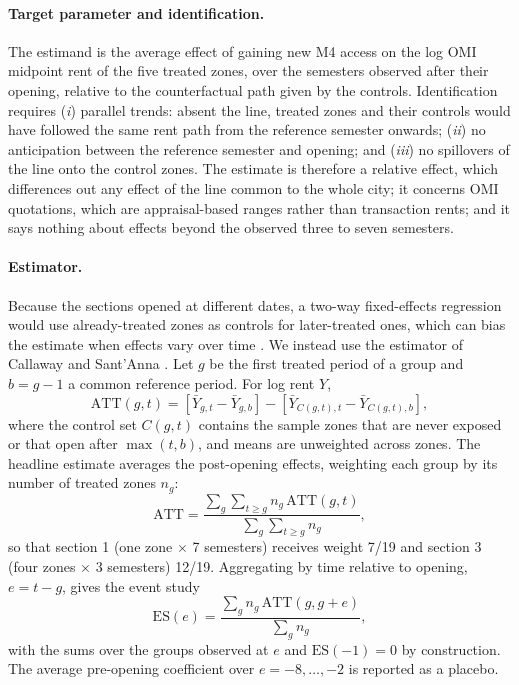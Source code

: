\paragraph{Target parameter and identification.} The estimand is the average effect of gaining new M4 access on the log OMI midpoint rent of the five treated zones, over the semesters observed after their opening, relative to the counterfactual path given by the controls. Identification requires (\textit{i}) parallel trends: absent the line, treated zones and their controls would have followed the same rent path from the reference semester onwards; (\textit{ii}) no anticipation between the reference semester and opening; and (\textit{iii}) no spillovers of the line onto the control zones. The estimate is therefore a relative effect, which differences out any effect of the line common to the whole city; it concerns OMI quotations, which are appraisal-based ranges rather than transaction rents; and it says nothing about effects beyond the observed three to seven semesters.

\paragraph{Estimator.} Because the sections opened at different dates, a two-way fixed-effects regression would use already-treated zones as controls for later-treated ones, which can bias the estimate when effects vary over time \cite{goodmanbacon2021,dechaisemartin2020}. We instead use the estimator of Callaway and Sant'Anna \cite{callaway2021}. Let $g$ be the first treated period of a group and $b=g-1$ a common reference period. For log rent $Y$,
\begin{equation}
\mathrm{ATT}(g,t)=\left[\bar Y_{g,t}-\bar Y_{g,b}\right]-\left[\bar Y_{C(g,t),t}-\bar Y_{C(g,t),b}\right],
\label{eq:attgt}
\end{equation}
where the control set $C(g,t)$ contains the sample zones that are never exposed or that open after $\max(t,b)$, and means are unweighted across zones. The headline estimate averages the post-opening effects, weighting each group by its number of treated zones $n_g$:
\begin{equation}
\mathrm{ATT}=\frac{\sum_g\sum_{t\ge g} n_g\,\mathrm{ATT}(g,t)}{\sum_g\sum_{t\ge g} n_g},
\label{eq:attagg}
\end{equation}
so that section 1 (one zone $\times$ 7 semesters) receives weight 7/19 and section 3 (four zones $\times$ 3 semesters) 12/19. Aggregating by time relative to opening, $e=t-g$, gives the event study
\begin{equation}
\mathrm{ES}(e)=\frac{\sum_g n_g\,\mathrm{ATT}(g,g+e)}{\sum_g n_g},
\label{eq:es}
\end{equation}
with the sums over the groups observed at $e$ and $\mathrm{ES}(-1)=0$ by construction. The average pre-opening coefficient over $e=-8,\dots,-2$ is reported as a placebo.

